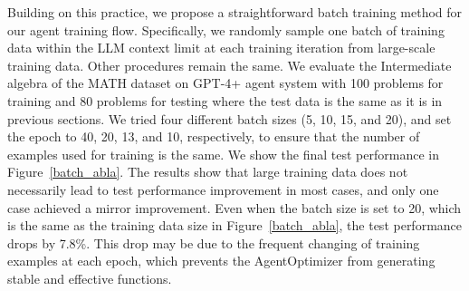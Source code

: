 \documentclass{article}
\theoremstyle{plain}
\theoremstyle{definition}
\theoremstyle{remark}
\begin{document}
Building on this practice, we propose a straightforward batch training method for our agent training flow. Specifically, we randomly sample one batch of training data within the LLM context limit at each training iteration from large-scale training data. Other procedures remain the same. 
We evaluate the Intermediate algebra of the MATH dataset on GPT-4+ agent system with 100 problems for training and 80 problems for testing where the test data is the same as it is in previous sections. 
We tried four different batch sizes (5, 10, 15, and 20), and set the epoch to 40, 20, 13, and 10, respectively, to ensure that the number of examples used for training is the same. We show the final test performance in Figure~\ref{batch_abla}.
The results show that large training data does not necessarily lead to test performance improvement in most cases, and only one case achieved a mirror improvement. Even when the batch size is set to 20, which is the same as the training data size in Figure~\ref{batch_abla}, the test performance drops by 7.8\%. This drop may be due to the frequent changing of training examples at each epoch, which prevents the AgentOptimizer from generating stable and effective functions.




\begin{table}[t]
\centering %
\setlength{\tabcolsep}{17pt} %
\vskip -0.09in
\caption{For illustration purposes, we list frequently used (during testing) functions generated by AgentOptimizer in different tasks.}
\label{tab_gen_tool}
\vspace{-0.2in}
\end{table}
\end{document}
